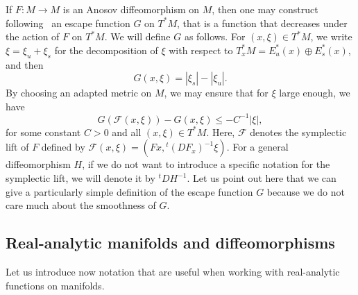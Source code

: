 \documentclass[AHL,Unicode,longabstracts,published]{cedram}
\newcommand{\va}[1]{\left|#1\right|}
\newcommand{\clF}{\mathcal{F}}
\begin{document}
If $F : M \to M$ is an Anosov diffeomorphism on $M$, then one may construct following~\cite{faure_roy_sjostrand} an escape function $G$ on $T^* M$, that is a function that decreases under the action of $F$ on $T^* M$. We will define $G$ as follows. For $(x,\xi) \in T^* M$, we write $\xi = \xi_u + \xi_s$ for the decomposition of $\xi$ with respect to $T^*_x M = E_u^*(x) \oplus E_s^*(x)$, and then
\begin{equation}\label{eq:definition_escape_function}
G(x,\xi) = \va{\xi_s} - \va{\xi_u}.
\end{equation}
By choosing an adapted metric on $M$, we may ensure that for $\xi$ large enough, we have
\begin{equation*}
G(\clF(x,\xi)) - G(x,\xi) \leq - C^{-1} \va{\xi},
\end{equation*}
for some constant $C > 0$ and all $(x,\xi) \in T^* M$. Here, $\clF$ denotes the symplectic lift of $F$ defined by $\clF(x,\xi) = (Fx, {}^t (DF_x)^{-1} \xi)$. For a general diffeomorphism $H$, if we do not want to introduce a specific notation for the symplectic lift, we will denote it by ${}^t D H^{-1}$. Let us point out here that we can give a particularly simple definition of the escape function $G$ because we do not care much about the smoothness of $G$.

\subsection{Real-analytic manifolds and diffeomorphisms}\label{subsection:definitions}

Let us introduce now notation that are useful when working with real-analytic functions on manifolds.
\end{document}
